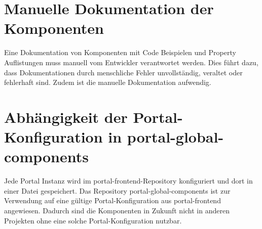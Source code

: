 \section{Manuelle Dokumentation der Komponenten}
\label{sec:manualDocumentation}
Eine Dokumentation von Komponenten mit Code Beispielen und Property Auflistungen muss manuell vom Entwickler verantwortet werden. Dies führt dazu, dass Dokumentationen durch menschliche Fehler unvollständig, veraltet oder fehlerhaft sind. Zudem ist die manuelle Dokumentation aufwendig.
 
\section{Abhängigkeit der Portal-Konfiguration in portal-global-components}
\label{sec:portalConfigDep}
Jede Portal Instanz wird im portal-frontend-Repository konfiguriert und dort in einer Datei gespeichert. Das Repository portal-global-components ist zur Verwendung auf eine gültige Portal-Konfiguration aus portal-frontend angewiesen. Dadurch sind die Komponenten in Zukunft nicht in anderen Projekten ohne eine solche Portal-Konfiguration nutzbar.
